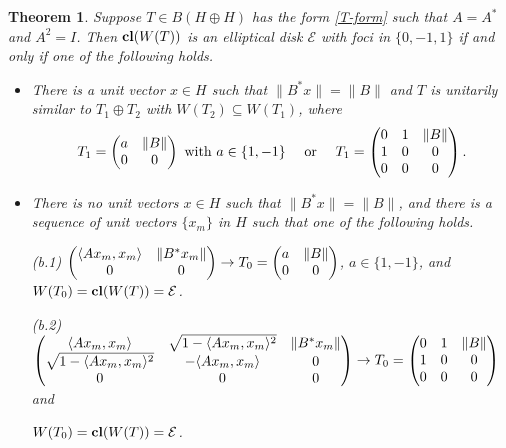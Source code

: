 \documentclass[11pt]{article}
\newtheorem{theorem}{Theorem}[section]
\numberwithin{equation}{section}
\def\cE{{\mathcal E}}
\def\la{\langle}
\def\ra{\rangle}
\def\cl{{\bf cl}}
\begin{document}
\begin{theorem} \label{3.4}
 Suppose $T \in B(H\oplus H)$ has the form \eqref{T-form} such that
$A= A^*$ and $A^2 = I$.
Then  $\cl(W(T))$ is an  elliptical disk ${\mathcal E}$ with foci
in $\{0, -1,1\}$ if and only if  one of
the following holds.
\begin{itemize}
\item[{\rm (a)}] There is a unit vector $x\in H$ such that
$\|B^*x\| = \|B\|$ and $T$ is unitarily similar to $T_1 \oplus T_2$
      with $W(T_2) \subseteq W(T_1)$, where
$$
T_1 = \begin{pmatrix} a & \|B\|\cr 0 & 0\cr\end{pmatrix} \hbox{ with } a \in \{1, -1\} \quad
             \hbox{ or }   \quad
    T_1 = \begin{pmatrix} 0 & 1 & \|B\| \cr  1 & 0 &  0\cr  0 & 0 & 0\cr\end{pmatrix}.$$
\item[{\rm (b)}] There is no unit vectors $x\in H$ such that $\|B^*x\| = \|B\|$,  and there is a sequence of unit
vectors $\{x_m\}$ in $H$ such that one of the following holds.

       \smallskip
        \noindent
        {\rm (b.1)} $\begin{pmatrix} \la Ax_m,x_m\ra &  \|B^*x_m\|\cr  0 & 0 \end{pmatrix}
        \rightarrow  T_0 = \begin{pmatrix} a & \|B\| \cr 0 & 0 \cr \end{pmatrix}$, $a \in \{1, -1\}$,
        and $W(T_0) = \cl (W(T)) = \cE$.

        \smallskip
        \noindent
         {\rm (b.2)}
         $\begin{pmatrix} \la Ax_m,x_m\ra & \sqrt{1-\la Ax_m,x_m\ra^2} &  \|B^*x_m\|\cr   \sqrt{1-\la Ax_m,x_m\ra^2} & -\la Ax_m,x_m\ra & 0 \cr 0 & 0 & 0 \cr \end{pmatrix}
        \rightarrow  T_0 = \begin{pmatrix} 0 & 1 & \|B\| \cr 1 & 0 & 0 \cr 0 & 0 & 0 \cr\end{pmatrix}$
        and

\qquad        $W(T_0) = \cl (W(T)) = \cE$.
\end{itemize}
\end{theorem}
\end{document}
